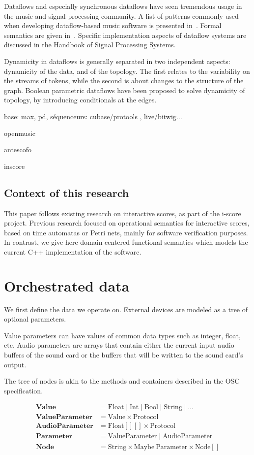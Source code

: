 \documentclass[applsci,article,submit,moreauthors,pdftex,10pt,a4paper]{mdpi}
\begin{document}
Dataflows and especially synchronous dataflows have seen tremendous usage in the music and signal processing community. 
A list of patterns commonly used when developing dataflow-based music software is presented in~\cite{arumi2006dataflow}.
Formal semantics are given in~\cite{benveniste_data-flow_1993}.
Specific implementation aspects of dataflow systems are discussed in the Handbook of Signal Processing Systems\cite{bhattacharyya_handbook_2013}. 

Dynamicity in dataflows is generally separated in two independent aspects: dynamicity of the data, and of the topology.
The first relates to the variability on the streams of tokens, while the second is about changes to the structure of the graph. 
Boolean parametric dataflows\cite{bempelis2015boolean} have been proposed to solve dynamicity of topology, by introducing conditionals at the edges.

base: max, pd, séquenceurs: cubase/protools , live/bitwig...

openmusic

antescofo

inscore


\subsection{Context of this research}
This paper follows existing research on interactive scores, as part of the i-score project.
Previous research focused on operational semantics for interactive scores, based on time automatas\cite{} or Petri nets\cite{}, mainly for software verification purposes. 
In contrast, we give here domain-centered functional semantics which models the current C++ implementation of the software.

\cite{celerier2017icmc}
\section{Orchestrated data}
We first define the data we operate on.
External devices are modeled as a tree of optional parameters.

Value parameters can have values of common data types such as integer, float, etc.
Audio parameters are arrays that contain either the current input audio buffers of the sound card or the buffers that will be written to the sound card's output.

The tree of nodes is akin to the methods and containers described in the OSC specification.

\begin{align*}
\mathbf{Value} & = \mathrm{Float} \mid \mathrm{Int} \mid \mathrm{Bool} \mid \mathrm{String} \mid \dots \\
\mathbf{ValueParameter} & = \mathrm{Value} \times \mathrm{Protocol} \\
\mathbf{AudioParameter} & = \mathrm{Float[][]} \times \mathrm{Protocol} \\
\mathbf{Parameter} & = \mathrm{ValueParameter} \mid \mathrm{AudioParameter} \\
\mathbf{Node} & = \mathrm{String} \times \mathrm{Maybe}~\mathrm{Parameter} \times \mathrm{Node[]} 
\end{align*}
\end{document}
